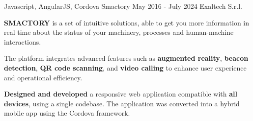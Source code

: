   \cventry
    {Javascript, AngularJS, Cordova} %
    {Smactory} %
    {May 2016 - July 2024} %
    {Exaltech S.r.l.} %
    {
      \begin{cvitems} %
        \item {\textbf{SMACTORY} is a set of intuitive solutions, able to get you more information in real time about the status of your machinery, processes and human-machine interactions.}
        \item {The platform integrates advanced features such as \textbf{augmented reality}, \textbf{beacon detection}, \textbf{QR code scanning}, and \textbf{video calling} to enhance user experience and operational efficiency.}  
        \item {\textbf{Designed and developed} a responsive web application compatible with \textbf{all devices}, using a single codebase. The application was converted into a hybrid mobile app using the Cordova framework.}  
      \end{cvitems}
    }